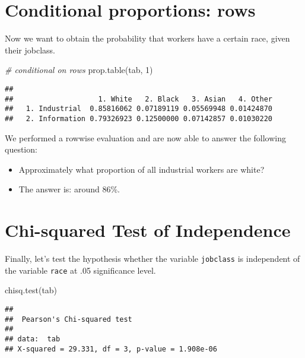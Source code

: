 \documentclass[
]{book}
\newenvironment{Shaded}{\begin{snugshade}}{\end{snugshade}}
\newcommand{\CommentTok}[1]{\textcolor[rgb]{0.56,0.35,0.01}{\textit{#1}}}
\newcommand{\DecValTok}[1]{\textcolor[rgb]{0.00,0.00,0.81}{#1}}
\newcommand{\FunctionTok}[1]{\textcolor[rgb]{0.00,0.00,0.00}{#1}}
\newcommand{\NormalTok}[1]{#1}
\providecommand{\tightlist}{%
  \setlength{\itemsep}{0pt}\setlength{\parskip}{0pt}}
\begin{document}
\hypertarget{conditional-proportions-rows}{%
\section{Conditional proportions: rows}\label{conditional-proportions-rows}}

Now we want to obtain the probability that workers have a certain race, given their jobclass.

\begin{Shaded}
\begin{Highlighting}[]
\CommentTok{\# conditional on rows}
\FunctionTok{prop.table}\NormalTok{(tab, }\DecValTok{1}\NormalTok{)  }
\end{Highlighting}
\end{Shaded}

\begin{verbatim}
##                 
##                    1. White   2. Black   3. Asian   4. Other
##   1. Industrial  0.85816062 0.07189119 0.05569948 0.01424870
##   2. Information 0.79326923 0.12500000 0.07142857 0.01030220
\end{verbatim}

We performed a rowwise evaluation and are now able to answer the following question:

\begin{itemize}
\tightlist
\item
  Approximately what proportion of all industrial workers are white?
\item
  The answer is: around 86\%.
\end{itemize}

\hypertarget{chi-squared-test-of-independence}{%
\section{Chi-squared Test of Independence}\label{chi-squared-test-of-independence}}

Finally, let's test the hypothesis whether the variable \texttt{jobclass} is independent of the variable \texttt{race} at .05 significance level.

\begin{Shaded}
\begin{Highlighting}[]
\FunctionTok{chisq.test}\NormalTok{(tab)  }
\end{Highlighting}
\end{Shaded}

\begin{verbatim}
## 
##  Pearson's Chi-squared test
## 
## data:  tab
## X-squared = 29.331, df = 3, p-value = 1.908e-06
\end{verbatim}
\end{document}
